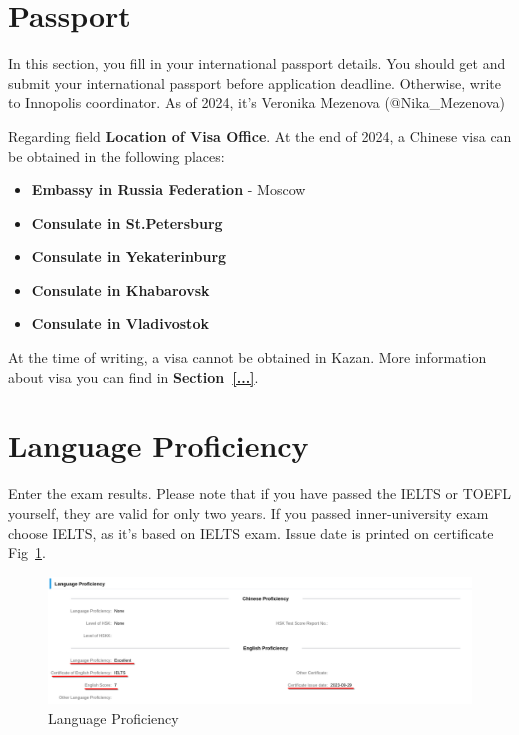 \section{Passport}\label{sec:ru_passport}

In this section, you fill in your international passport details.
You should get and submit your international passport before application deadline.
Otherwise, write to Innopolis coordinator.
As of 2024, it's Veronika Mezenova (@Nika\_Mezenova)

Regarding field \textbf{Location of Visa Office}.
At the end of 2024, a Chinese visa can be obtained in the following places:

\begin{itemize}
    \item \textbf{Embassy in Russia Federation} - Moscow
    \item \textbf{Consulate in St.Petersburg}
    \item \textbf{Consulate in Yekaterinburg}
    \item \textbf{Consulate in Khabarovsk}
    \item \textbf{Consulate in Vladivostok}
\end{itemize}


\begin{note}
    At the time of writing, a visa cannot be obtained in Kazan.
    More information about visa you can find in \textbf{Section~\ref{...}}.
\end{note}









\section{Language Proficiency}
Enter the exam results.
Please note that if you have passed the IELTS or TOEFL yourself,
they are valid for only two years.
If you passed inner-university exam choose IELTS, as it's based on IELTS exam.
Issue date is printed on certificate Fig~\ref{fig:ru_lang_prof}.


\begin{figure}[H]
    \centering
    \includegraphics[width=\textwidth]{russia/imgs/app_5_language}
    \caption{\centering Language Proficiency}
    \label{fig:ru_lang_prof}
\end{figure}









